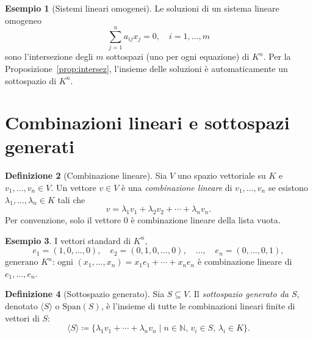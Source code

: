 \documentclass[11pt, a4paper]{book}
\theoremstyle{definition}
\newtheorem{definizione}{Definizione}[section]
\newtheorem{esempio}[definizione]{Esempio}
\theoremstyle{plain}
\theoremstyle{remark}
\newcommand{\N}{\mathbb{N}}
\begin{document}
\begin{exbox}
\begin{esempio}[Sistemi lineari omogenei]
Le soluzioni di un sistema lineare omogeneo
\[
  \sum_{j=1}^n a_{ij} x_j = 0, \quad i = 1, \ldots, m
\]
sono l'intersezione degli $m$ sottospazi (uno per ogni equazione) di $K^n$. Per la Proposizione~\ref{prop:intersez}, l'insieme delle soluzioni è automaticamente un sottospazio di $K^n$.
\end{esempio}
\end{exbox}

\section{Combinazioni lineari e sottospazi generati}

\begin{defbox}
\begin{definizione}[Combinazione lineare]
Sia $V$ uno spazio vettoriale su $K$ e $v_1, \ldots, v_n \in V$. Un vettore $v \in V$ è una \emph{combinazione lineare} di $v_1, \ldots, v_n$ se esistono $\lambda_1, \ldots, \lambda_n \in K$ tali che
\[
  v = \lambda_1 v_1 + \lambda_2 v_2 + \cdots + \lambda_n v_n.
\]
Per convenzione, solo il vettore $0$ è combinazione lineare della lista vuota.
\end{definizione}
\end{defbox}

\begin{exbox}
\begin{esempio}
I vettori standard di $K^n$,
\[
  e_1 = (1,0,\ldots,0),\quad e_2 = (0,1,0,\ldots,0),\quad \ldots,\quad e_n = (0,\ldots,0,1),
\]
generano $K^n$: ogni $(x_1,\ldots,x_n) = x_1 e_1 + \cdots + x_n e_n$ è combinazione lineare di $e_1,\ldots,e_n$.
\end{esempio}
\end{exbox}

\begin{defbox}
\begin{definizione}[Sottospazio generato]
Sia $S \subseteq V$. Il \emph{sottospazio generato da $S$}, denotato $\langle S \rangle$ o $\mathrm{Span}(S)$, è l'insieme di tutte le combinazioni lineari finite di vettori di $S$:
\[
  \langle S \rangle \coloneqq \{\lambda_1 v_1 + \cdots + \lambda_n v_n \mid n \in \N,\, v_i \in S,\, \lambda_i \in K\}.
\]
\end{definizione}
\end{defbox}
\end{document}
